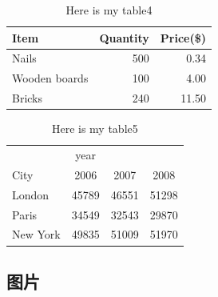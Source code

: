 \documentclass[a4paper,12pt]{article}
\begin{document}
        \begin{table}[H]
            \centering
            \begin{tabular}{l|r|r}
                Item             &   Quantity     &   Price(\$)     \\
                \hline
                Nails            &    500         &    0.34          \\
                Wooden boards    &    100         &    4.00          \\
                Bricks           &    240         &    11.50          \\
            \end{tabular}
            \caption{Here is my table4}
        \end{table}

        
        \begin{table}[H]
            \centering
            \begin{tabular}{l|ccc}
                      &      year                      \\
                \cline{2-4}
                City      &   2006    &   2007    &   2008   \\
                \hline
                London    &   45789   &   46551   &   51298   \\
                Paris     &   34549   &   32543   &   29870    \\
                New York  &   49835   &   51009   &   51970    \\
            \end{tabular}
            \caption{Here is my table5}
        \end{table}
        
        \subsection{图片} %
        
\end{document}
